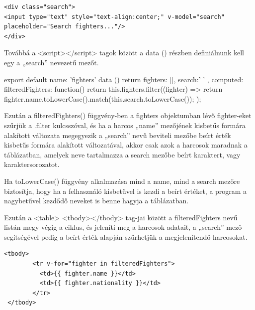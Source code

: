 \begin{verbatim}
<div class="search">
<input type="text" style="text-align:center;" v-model="search" placeholder="Search fighters..."/>
</div>
\end{verbatim}

Továbbá a <script></script> tagok között a data () részben definiálnunk kell egy a „search” nevezetű mezőt.

\begin{cpp}
export default {
  name: 'fighters'
   data () {
    return {
      fighters: [],
      search:' '  }},
computed: {
    	filteredFighters: function(){
    		return this.fighters.filter((fighter) => {
return fighter.name.toLowerCase().match(this.search.toLowerCase());
    		});}}
}
\end{cpp}

Ezután a filteredFighters() függvény-ben a fighters objektumban lévő fighter-eket szűrjük a .filter kulcsszóval, és ha a harcos „name” mezőjének kisbetűs formára alakított változata megegyezik a „search” nevű beviteli mezőbe beírt érték kisbetűs formára alakított változatával, akkor csak azok a harcosok maradnak a táblázatban, amelyek neve tartalmazza a search mezőbe beírt karaktert, vagy karaktersorozatot.

Ha toLowerCase() függvény alkalmazása mind a name, mind a search mezőre biztosítja, hogy ha a felhasználó kisbetűvel is kezdi a beírt értéket, a program a nagybetűvel kezdődő neveket is benne hagyja a táblázatban.

Ezután a <table> <tbody></tbody> tag-jai között a filteredFighters nevű listán megy végig a ciklus, és jeleníti meg a harcosok adatait, a „search” mező segítségével pedig a beírt érték alapján szűrhetjük a megjelenítendő harcosokat.

\begin{verbatim}
<tbody>
        <tr v-for="fighter in filteredFighters">
          <td>{{ fighter.name }}</td>
          <td>{{ fighter.nationality }}</td>
        </tr>
 </tbody>
\end{verbatim}


